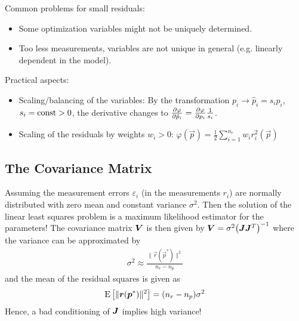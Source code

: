			Common problems for small residuals:
			\begin{itemize}
				\item Some optimization variables might not be uniquely determined.
				\item Too less measurements, variables are not unique in general (e.g. linearly dependent in the model).
			\end{itemize}

			Practical aspects:
			\begin{itemize}
				\item Scaling/balancing of the variables: By the transformation \( p_i \to \hat{p}_i = s_i p_i \), \( s_i = \operatorname{const} > 0 \), the derivative changes to \( \pdv{\varphi}{\hat{p}_i} = \pdv{\varphi}{p_i} \frac{1}{s_i} \).
				\item Scaling of the residuals by weights \( w_i > 0 \): \( \varphi(\vec{p}) = \frac{1}{2} \sum_{i = 1}^{n_r} w_i r_i^2(\vec{p}) \)
			\end{itemize}

		\subsection{The Covariance Matrix}
			Assuming the measurement errors \( \varepsilon_i \) (in the measurements \(r_i\)) are normally distributed with zero mean and constant variance \(\sigma^2\). Then the solution of the linear least squares problem is a maximum likelihood estimator for the parameters! The covariance matrix \(\bm{V}\) is then given by \( \bm{V} = \sigma^2 \big(\bm{J} \bm{J}^T\big)^{-1} \) where the variance can be approximated by
			\begin{align*}
				\sigma^2 \approx \frac{\lVert \vec{r}(\vec{p}^\ast) \rVert^2}{n_r - n_p}
			\end{align*}
			and the mean of the residual squares is given as
			\begin{align*}
				\operatorname{E}\big[ \lVert \bm{r}(\bm{p}^\ast) \rVert^2 \big] = (n_r - n_p) \sigma^2
			\end{align*}
			Hence, a bad conditioning of \(\bm{J}\) implies high variance!

